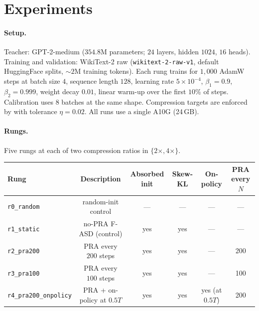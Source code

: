 \documentclass[11pt]{article}
\newcommand{\fasd}{\textsc{F-ASD}}
\newcommand{\pra}{\textsc{PRA}}
\begin{document}
\section{Experiments}
\label{sec:exp}

\paragraph{Setup.}
Teacher: GPT-2-medium ($354.8$M parameters; $24$ layers, hidden $1024$,
$16$ heads). Training and validation: WikiText-2 raw
(\texttt{wikitext-2-raw-v1}, default HuggingFace splits, $\sim\!2$M
training tokens). Each rung trains for $1{,}000$ AdamW steps at batch
size $4$, sequence length $128$, learning rate $5\!\times\!10^{-4}$,
$\beta_1\!=\!0.9$, $\beta_2\!=\!0.999$, weight decay $0.01$, linear
warm-up over the first $10\%$ of steps. Calibration uses $8$ batches at
the same shape. Compression targets are enforced by 
with tolerance $\eta\!=\!0.02$. All runs use a single A10G
(24\,GB).

\paragraph{Rungs.}
Five rungs at each of two compression ratios in $\{2\times, 4\times\}$.

\begin{center}
\footnotesize
\setlength{\tabcolsep}{4pt}
\begin{tabular}{lccccc}
\toprule
Rung & Description & Absorbed init & Skew-KL & On-policy & \pra{} every $N$ \\
\midrule
\texttt{r0\_random}            & random-init control          & ---  & ---  & ---             & --- \\
\texttt{r1\_static}            & no-\pra{} \fasd{} (control)  & yes  & yes  & ---             & --- \\
\texttt{r2\_pra200}            & \pra{} every $200$ steps     & yes  & yes  & ---             & 200 \\
\texttt{r3\_pra100}            & \pra{} every $100$ steps     & yes  & yes  & ---             & 100 \\
\texttt{r4\_pra200\_onpolicy}  & \pra{} + on-policy at $0.5T$ & yes  & yes  & yes (at $0.5T$) & 200 \\
\bottomrule
\end{tabular}
\end{center}
\end{document}
